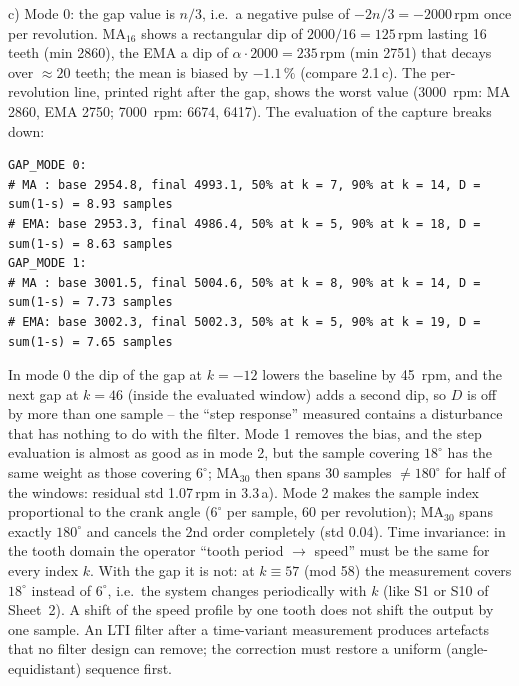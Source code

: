 \begin{solution}
c) Mode 0: the gap value is $n/3$, i.e.\ a negative pulse of $-2n/3=-2000$\,rpm
once per revolution. MA$_{16}$ shows a rectangular dip of $2000/16=125$\,rpm
lasting 16 teeth (min 2860), the EMA a dip of $\alpha\cdot2000=235$\,rpm (min
2751) that decays over $\approx20$ teeth; the mean is biased by $-1.1\,\%$
(compare 2.1\,c). The per-revolution line, printed right after the gap, shows the
worst value (\SI{3000}{rpm}: MA 2860, EMA 2750; \SI{7000}{rpm}: 6674, 6417).
The evaluation of the capture breaks down:
\begin{lstlisting}[style=shell,numbers=none]
GAP_MODE 0:
# MA : base 2954.8, final 4993.1, 50% at k = 7, 90% at k = 14, D = sum(1-s) = 8.93 samples
# EMA: base 2953.3, final 4986.4, 50% at k = 5, 90% at k = 18, D = sum(1-s) = 8.63 samples
GAP_MODE 1:
# MA : base 3001.5, final 5004.6, 50% at k = 8, 90% at k = 14, D = sum(1-s) = 7.73 samples
# EMA: base 3002.3, final 5002.3, 50% at k = 5, 90% at k = 19, D = sum(1-s) = 7.65 samples
\end{lstlisting}
In mode 0 the dip of the gap at $k=-12$ lowers the baseline by
\SI{45}{rpm}, and the next gap at $k=46$ (inside the evaluated window) adds a
second dip, so $D$ is off by more than one sample -- the ``step response''
measured contains a disturbance that has nothing to do with the filter.
Mode 1 removes the bias, and the step evaluation is almost as good as in mode 2,
but the sample covering $18^\circ$ has the same weight as those covering
$6^\circ$; MA$_{30}$ then spans $30$ samples $\neq180^\circ$ for half of the
windows: residual std 1.07\,rpm in 3.3\,a). Mode 2 makes the sample index
proportional to the crank angle ($6^\circ$ per sample, 60 per revolution); MA$_{30}$
spans exactly $180^\circ$ and cancels the 2nd order completely (std 0.04).
Time invariance: in the tooth domain the operator ``tooth period $\to$ speed''
must be the same for every index $k$. With the gap it is not: at $k\equiv57$
(mod 58) the measurement covers $18^\circ$ instead of $6^\circ$, i.e.\ the system
changes periodically with $k$ (like S1 or S10 of Sheet~2). A shift of the speed
profile by one tooth does not shift the output by one sample. An LTI filter after a
time-variant measurement produces artefacts that no filter design can remove;
the correction must restore a uniform (angle-equidistant) sequence first.


\end{solution}
